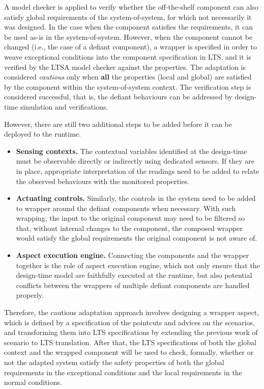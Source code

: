 A model checker is applied to verify whether the off-the-shelf component can also satisfy  global requirements of the system-of-system, for which not necessarily it was designed. In the case when the component satisfies the requirements, it can be used as-is in the system-of-system. However, when the component cannot be changed (i.e., the case of a defiant component), a wrapper is specified in order to weave exceptional conditions into the component specification in LTS, and it is verified by the LTSA model checker against the properties.  The adaptation is considered {\it cautious} only when {\bf all} the properties (local and global) are satisfied by the component within the system-of-system context. The verification step is considered successful, that is, the defiant behaviours can be addressed by design-time simulation and verifications. 

However, there are still two additional steps to be added before it can be deployed to the runtime.

\begin{itemize}
\item {\bf Sensing contexts.} The contextual variables identified at the design-time must be observable directly or indirectly using dedicated sensors. If they are in place, appropriate interpretation of the readings need to be added to relate the observed behaviours with the monitored properties.
\item {\bf Actuating controls.} Similarly, the controls in the system need to be added to wrapper around the defiant components when necessary. With such wrapping, the input to the original component may need to be filtered so that, without internal changes to the component, the composed wrapper would satisfy the global requirements the original component is not aware of. 
\item {\bf Aspect execution engine.} Connecting the components and the wrapper together is the role of aspect execution engine, which not only ensure that the design-time model are faithfully executed at the runtime, but also potential conflicts between the wrappers of multiple defiant components are handled properly. 
\end{itemize}

Therefore, the cautious adaptation approach involves designing a wrapper aspect, which is defined by a specification of the pointcuts and advices on the scenarios, and transforming them into LTS specifications by extending the previous work of scenario to LTS translation. After that, the LTS specifications of both the global context and the wrapped component will be used to check, formally, whether or not the adapted system satisfy the safety properties of both the global requirements in the exceptional conditions and the local requirements in the normal conditions.

